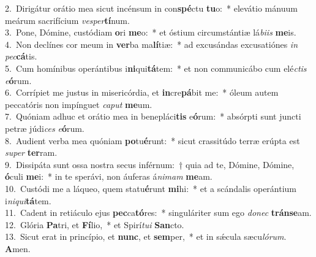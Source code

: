 {2.~}Dirigátur orátio mea sicut incénsum in con\textbf{spé}ctu \textbf{tu}o:~* elevátio mánuum meárum sacrifícium \textit{ve}\textit{sper}\textbf{tí}num.\\
{3.~}Pone, Dómine, custódiam \textbf{o}ri \textbf{me}o:~* et óstium circumstántiæ lá\textit{bi}\textit{is} \textbf{me}is.\\
{4.~}Non declínes cor meum in \textbf{ver}ba ma\textbf{lí}tiæ:~* ad excusándas excusatiónes \textit{in} \textit{pec}\textbf{cá}tis.\\
{5.~}Cum homínibus operántibus i\textbf{ni}qui\textbf{tá}tem:~* et non communicábo cum elé\textit{ctis} \textit{e}\textbf{ó}rum.\\
{6.~}Corrípiet me justus in misericórdia, et \textbf{in}cre\textbf{pá}bit me:~* óleum autem peccatóris non impínguet \textit{ca}\textit{put} \textbf{me}um.\\
{7.~}Quóniam adhuc et orátio mea in benepláci\textbf{tis} e\textbf{ó}rum:~* absórpti sunt juncti petræ júdi\textit{ces} \textit{e}\textbf{ó}rum.\\
{8.~}Audient verba mea quóniam \textbf{po}tu\textbf{é}runt:~* sicut crassitúdo terræ erúpta est \textit{su}\textit{per} \textbf{ter}ram.\\
{9.~}Dissipáta sunt ossa nostra secus inférnum:~† quia ad te, Dómine, Dómine, \textbf{ó}culi \textbf{me}i:~* in te sperávi, non áuferas á\textit{ni}\textit{mam} \textbf{me}am.\\
{10.~}Custódi me a láqueo, quem statu\textbf{é}runt \textbf{mi}hi:~* et a scándalis operántium i\textit{ni}\textit{qui}\textbf{tá}tem.\\
{11.~}Cadent in retiáculo ejus \textbf{pec}ca\textbf{tó}res:~* singuláriter sum ego \textit{do}\textit{nec} \textbf{trán}\textbf{se}am.\\
{12.~}Glória \textbf{Pa}tri, et \textbf{Fí}lio,~* et Spirí\textit{tu}\textit{i} \textbf{San}cto.\\
{13.~}Sicut erat in princípio, et \textbf{nunc}, et \textbf{sem}per,~* et in sǽcula sæcu\textit{ló}\textit{rum}. \textbf{A}men.\\
